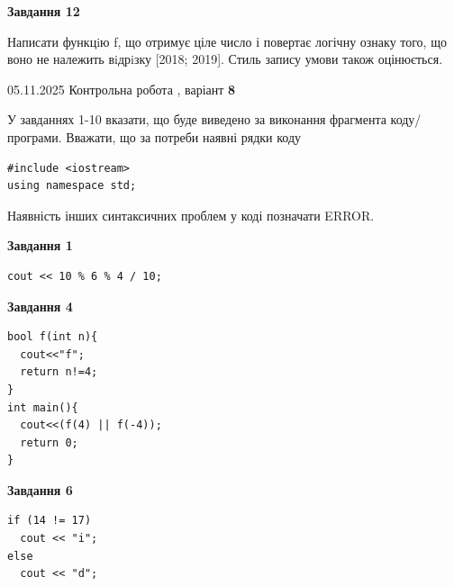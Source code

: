 \documentclass[12pt, ukrainian]{article}
\begin{document}
{\begin {large}
\begin{minipage}[t]{11.0cm}
\begin{center}
\textbf{Завдання 12}
\end{center}

Написати функцiю f, що отримує ціле число і повертає логічну ознаку того, що воно не належить вiдрiзку [2018; 2019]. Стиль запису умови також оцінюється.\par

\end{minipage}

\end {large}}
\newpage

{\Large{05.11.2025 Контрольна робота , варіант  \No \textbf { 8 }\par}}
{
\begin {large}
У завданнях 1-10 вказати, що буде виведено за виконання фрагмента коду/про\-гра\-ми.
Вважати, що за потреби наявні рядки коду
\begin{verbatim}
#include <iostream>
using namespace std;
\end{verbatim}
Наявність інших синтаксичних проблем у коді позначати ERROR.

\begin{minipage}[t]{7.0cm}

\begin{center}
\textbf{Завдання 1}
\end{center}
\vspace{-8mm}

\begin{verbatim}
cout << 10 % 6 % 4 / 10;
\end{verbatim}



\begin{center}
\textbf{Завдання 4}
\end{center}
\vspace{-8mm}

\begin{verbatim}
bool f(int n){
  cout<<"f";
  return n!=4;
}
int main(){
  cout<<(f(4) || f(-4));
  return 0;
}
\end{verbatim}



\begin{center}
\textbf{Завдання 6}
\end{center}
\vspace{-8mm}

\begin{verbatim}
if (14 != 17)
  cout << "i";
else
  cout << "d";
\end{verbatim}




\end{minipage}
\end{large}}
\end{document}
